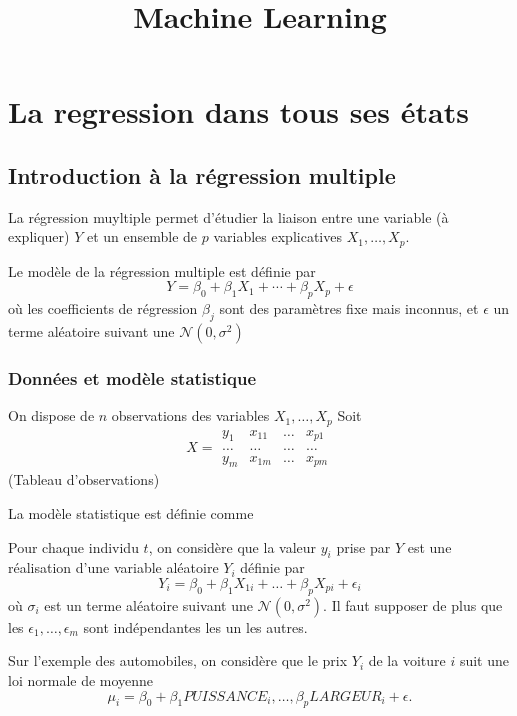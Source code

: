 \documentclass{article}
\title{Machine Learning}
\begin{document}
\section{La regression dans tous ses \'etats}
\subsection{Introduction \`a la r\'egression multiple}
La r\'egression muyltiple permet d'\'etudier la liaison entre une variable (\`a expliquer) $Y$ et un ensemble de $p$ variables explicatives $X_1,\ldots,X_p$.

Le mod\`ele de la r\'egression multiple est d\'efinie par
\begin{equation}
Y=\beta_0+\beta_1 X_1 +\cdots+\beta_p X_p+\epsilon
\end{equation}
o\`u les coefficients de r\'egression $\beta_j$ sont des param\`etres fixe mais inconnus, et $\epsilon$ un terme al\'eatoire suivant une $\mathcal{N}(0,\sigma^2)$

\subsubsection{Donn\'ees et mod\`ele statistique}

On dispose de $n$ observations des variables $X_1,\ldots,X_p$
Soit 
\begin{equation}
X=
\begin{split}
y_1 & x_{11} & \ldots & x_{p1} \\
\ldots & \ldots & \ldots & \ldots \\
y_m & x_{1m} & \ldots & x_{pm}
\end{split}
\end{equation}
(Tableau d'observations)

La mod\`ele statistique est d\'efinie comme 

Pour chaque individu $t$, on consid\`ere que la valeur $y_i$ prise par $Y$ est une r\'ealisation d'une variable al\'eatoire $Y_i$ d\'efinie par 
\begin{equation}
Y_i=\beta_0+\beta_1 X_{1i}+\ldots+\beta_p X_{pi}+\epsilon_i
\end{equation}
o\`u $\sigma_i$ est un terme al\'eatoire suivant une $\mathcal{N}(0,\sigma^2)$. Il faut supposer de plus que les $\epsilon_1,\ldots,\epsilon_m$ sont ind\'ependantes les un les autres.

Sur l'exemple des automobiles, on consid\`ere que le prix $Y_i$ de la voiture $i$ suit une loi normale de moyenne
\begin{equation}
\mu_i=\beta_0+\beta_1 PUISSANCE_i,\ldots,\beta_p LARGEUR_i+\epsilon.
\end{equation} 
\end{document}
